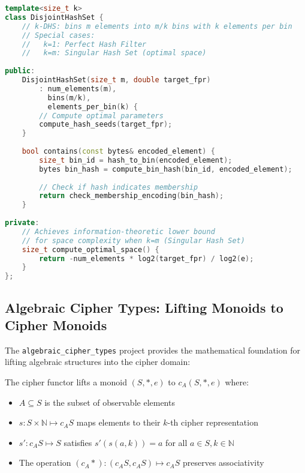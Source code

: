 \begin{lstlisting}[language=C++, caption={k-Disjoint Hash Set implementation}]
template<size_t k>
class DisjointHashSet {
    // k-DHS: bins m elements into m/k bins with k elements per bin
    // Special cases:
    //   k=1: Perfect Hash Filter
    //   k=m: Singular Hash Set (optimal space)
    
public:
    DisjointHashSet(size_t m, double target_fpr) 
        : num_elements(m), 
          bins(m/k), 
          elements_per_bin(k) {
        // Compute optimal parameters
        compute_hash_seeds(target_fpr);
    }
    
    bool contains(const bytes& encoded_element) {
        size_t bin_id = hash_to_bin(encoded_element);
        bytes bin_hash = compute_bin_hash(bin_id, encoded_element);
        
        // Check if hash indicates membership
        return check_membership_encoding(bin_hash);
    }
    
private:
    // Achieves information-theoretic lower bound
    // for space complexity when k=m (Singular Hash Set)
    size_t compute_optimal_space() {
        return -num_elements * log2(target_fpr) / log2(e);
    }
};
\end{lstlisting}

\subsection{Algebraic Cipher Types: Lifting Monoids to Cipher Monoids}

The \texttt{algebraic\_cipher\_types} project provides the mathematical foundation for lifting algebraic structures into the cipher domain:

\begin{definition}
The cipher functor lifts a monoid $(S,*,e)$ to $c_A(S,*,e)$ where:
\begin{itemize}
\item $A \subseteq S$ is the subset of observable elements
\item $s: S \times \mathbb{N} \mapsto c_A S$ maps elements to their $k$-th cipher representation
\item $s': c_A S \mapsto S$ satisfies $s'(s(a,k)) = a$ for all $a \in S, k \in \mathbb{N}$
\item The operation $(c_A *): (c_A S, c_A S) \mapsto c_A S$ preserves associativity
\end{itemize}
\end{definition}

